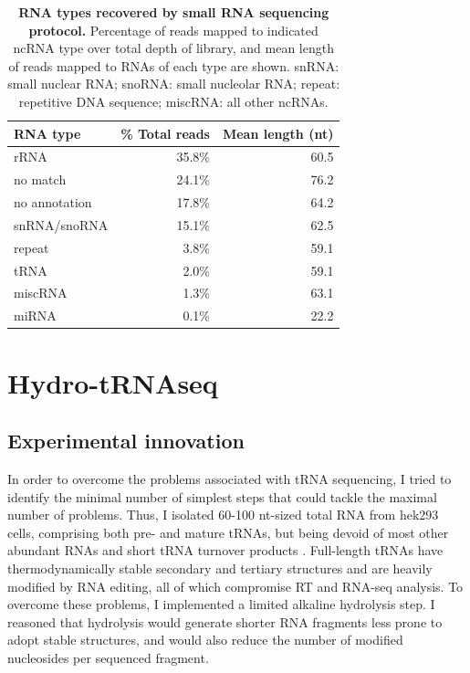 \documentclass[12pt]{rockefeller}
\begin{document}
\begin{table}[!ht]
\begin{center}
\tabulinesep=1.2mm
\begin{tabu}{ | l | r | r |}
	\hline
    RNA type & \% Total reads & Mean length (nt) \\ \hline
	rRNA & 35.8\% & 60.5 \\ \hline
	no match  & 24.1\% & 76.2 \\ \hline
	no annotation & 17.8\% & 64.2 \\ \hline
	snRNA/snoRNA & 15.1\% & 62.5 \\ \hline
	repeat & 3.8\% & 59.1 \\ \hline
	tRNA & 2.0\% & 59.1 \\ \hline
	miscRNA & 1.3\% & 63.1 \\ \hline
	miRNA & 0.1\% & 22.2 \\
	\hline
\end{tabu}
\end{center}
\caption[RNA types recovered by small RNA sequencing protocol]{\textbf{RNA types recovered by small RNA sequencing protocol.} Percentage of reads mapped to indicated ncRNA type over total depth of library, and mean length of reads mapped to RNAs of each type are shown. snRNA: small nuclear RNA; snoRNA: small nucleolar RNA; repeat: repetitive DNA sequence; miscRNA: all other ncRNAs.	}\label{abysmal}
\end{table}

\chapter{Hydro-tRNAseq}

\section{Experimental innovation}
In order to overcome the problems associated with tRNA sequencing, I tried to identify the minimal number of simplest steps that could tackle the maximal number of problems. Thus, I isolated 60-100 nt-sized total RNA from \gls{hek293} cells, comprising both pre- and mature tRNAs, but being devoid of most other abundant RNAs and short tRNA turnover products \cite{Lee:2009fb}. Full-length tRNAs have thermodynamically stable secondary and tertiary structures and are heavily modified by RNA editing, all of which compromise RT and RNA-seq analysis. To overcome these problems, I implemented a limited alkaline hydrolysis step. I reasoned that hydrolysis would generate shorter RNA fragments less prone to adopt stable structures, and would also reduce the number of modified nucleosides per sequenced fragment. 
\end{document}
